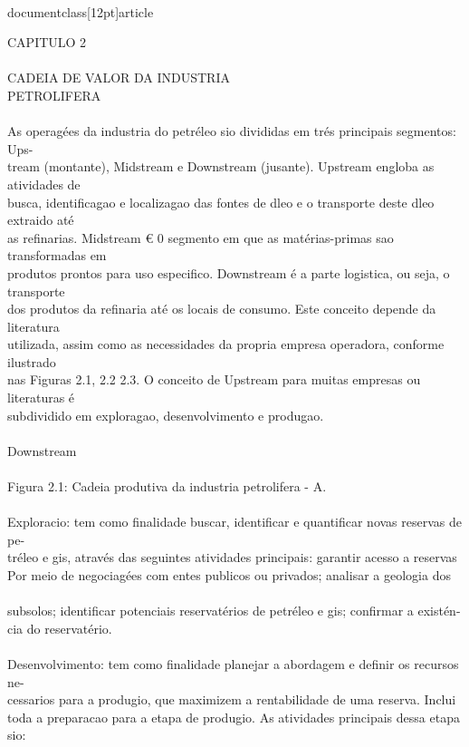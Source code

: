 \\documentclass[12pt]{article}
\begin{document}
CAPITULO 2\\
\\
CADEIA DE VALOR DA INDUSTRIA\\
PETROLIFERA\\
\\
As operagées da industria do petréleo sio divididas em trés principais segmentos: Ups-\\
tream (montante), Midstream e Downstream (jusante). Upstream engloba as atividades de\\
busca, identificagao e localizagao das fontes de dleo e o transporte deste dleo extraido até\\
as refinarias. Midstream € 0 segmento em que as matérias-primas sao transformadas em\\
produtos prontos para uso especifico. Downstream é a parte logistica, ou seja, o transporte\\
dos produtos da refinaria até os locais de consumo. Este conceito depende da literatura\\
utilizada, assim como as necessidades da propria empresa operadora, conforme ilustrado\\
nas Figuras 2.1, 2.2 2.3. O conceito de Upstream para muitas empresas ou literaturas é\\
subdividido em exploragao, desenvolvimento e produgao.\\
\\
Downstream\\
\\
Figura 2.1: Cadeia produtiva da industria petrolifera - A.\\
\\
Exploracio: tem como finalidade buscar, identificar e quantificar novas reservas de pe-\\
tréleo e gis, através das seguintes atividades principais: garantir acesso a reservas\\
Por meio de negociagées com entes publicos ou privados; analisar a geologia dos\\
\\
subsolos; identificar potenciais reservatérios de petréleo e gis; confirmar a existén-\\
cia do reservatério.\\
\\
Desenvolvimento: tem como finalidade planejar a abordagem e definir os recursos ne-\\
cessarios para a produgio, que maximizem a rentabilidade de uma reserva. Inclui\\
toda a preparacao para a etapa de produgio. As atividades principais dessa etapa sio:\\
\end{document}
